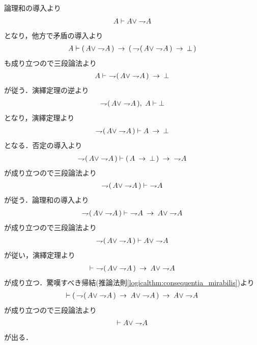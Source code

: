 	\begin{prf}
		論理和の導入より
		\begin{align}
			A \vdash A \vee \negation A
		\end{align}
		となり，他方で矛盾の導入より
		\begin{align}
			A \vdash (\, A \vee \negation A\, )
			\rarrow (\, \negation (\, A \vee \negation A\, ) \rarrow \bot\, )
		\end{align}
		も成り立つので三段論法より
		\begin{align}
			A \vdash\ \negation (\, A \vee \negation A\, ) \rarrow \bot
		\end{align}
		が従う．演繹定理の逆より
		\begin{align}
			\negation (\, A \vee \negation A\, ),\ A \vdash \bot
		\end{align}
		となり，演繹定理より
		\begin{align}
			\negation (\, A \vee \negation A\, ) \vdash A \rarrow \bot
		\end{align}
		となる．否定の導入より
		\begin{align}
			\negation (\, A \vee \negation A\, ) \vdash (\, A \rarrow \bot\, )
			\rarrow\ \negation A
		\end{align}
		が成り立つので三段論法より
		\begin{align}
			\negation (\, A \vee \negation A\, ) \vdash\ \negation A
		\end{align}
		が従う．論理和の導入より
		\begin{align}
			\negation (\, A \vee \negation A\, ) \vdash\ \negation A
			\rarrow A \vee \negation A
		\end{align}
		が成り立つので三段論法より
		\begin{align}
			\negation (\, A \vee \negation A\, ) \vdash A \vee \negation A
		\end{align}
		が従い，演繹定理より
		\begin{align}
			\vdash\ \negation (\, A \vee \negation A\, ) \rarrow A \vee \negation A
		\end{align}
		が成り立つ．驚嘆すべき帰結(推論法則\ref{logicalthm:consequentia_mirabilis})より
		\begin{align}
			\vdash
			(\, \negation (\, A \vee \negation A\, ) \rarrow A \vee \negation A\, )
			\rarrow A \vee \negation A
		\end{align}
		が成り立つので三段論法より
		\begin{align}
			\vdash A \vee \negation A
		\end{align}
		が出る．
		\QED
	\end{prf}
	
